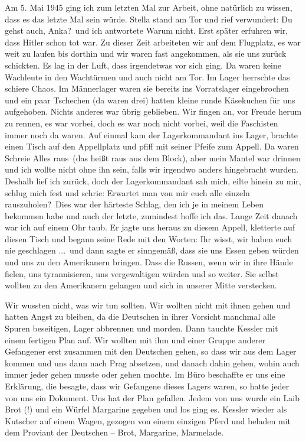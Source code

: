 \documentclass[a4paper,12pt,ngerman,
]{nisebook}
\begin{document}
Am 5. Mai 1945 ging ich zum letzten Mal zur Arbeit, ohne natürlich zu wissen, dass es das letzte Mal sein würde. Stella stand am Tor und rief verwundert: \glqq Du gehst auch, Anka?\grqq~und ich antwortete \glqq Warum nicht\grqq. Erst später erfuhren wir, dass Hitler schon tot war. Zu dieser Zeit arbeiteten wir auf dem Flugplatz, es war weit zu laufen bis dorthin und wir waren fast angekommen, als sie uns zurück schickten. Es lag in der Luft, dass irgendetwas vor sich ging. Da waren keine Wachleute in den Wachtürmen und auch nicht am Tor. Im Lager herrschte das schiere Chaos. Im Männerlager waren sie bereits ins Vorratslager eingebrochen und ein paar Tschechen (da waren drei) hatten kleine runde Käsekuchen für uns aufgehoben. Nichts anderes war übrig geblieben. Wir fingen an, vor Freude herum zu rennen, es war vorbei, doch es war noch nicht vorbei, weil die Faschisten immer noch da waren. Auf einmal kam der Lagerkommandant ins Lager, brachte einen Tisch auf den Appellplatz und pfiff mit seiner Pfeife zum Appell. Da waren Schreie \glqq Alles raus\grqq~(das heißt raus aus dem Block), aber mein Mantel war drinnen und ich wollte nicht ohne ihn sein, falls wir irgendwo anders hingebracht wurden. Deshalb lief ich zurück, doch der Lagerkommandant sah mich, eilte hinein zu mir, schlug mich fest und schrie: \glqq Erwartet man von mir euch alle einzeln rauszuholen?\grqq~Dies war der härteste Schlag, den ich je in meinem Leben bekommen habe und auch der letzte, zumindest hoffe ich das. Lange Zeit danach war ich auf einem Ohr taub. Er jagte uns heraus zu diesem Appell, kletterte auf diesen Tisch und begann seine Rede mit den Worten: \glqq Ihr wisst, wir haben euch nie geschlagen ...\grqq~und dann sagte er sinngemäß, dass sie uns Essen geben würden und uns zu den Amerikanern bringen. Dass die Russen, wenn wir in ihre Hände fielen, uns tyrannisieren, uns vergewaltigen würden und so weiter. Sie selbst wollten zu den Amerikanern gelangen und sich in unserer Mitte verstecken. 

Wir wussten nicht, was wir tun sollten. Wir wollten nicht mit ihnen gehen und hatten Angst zu bleiben, da die Deutschen in ihrer Vorsicht manchmal alle Spuren beseitigen, Lager abbrennen und morden. Dann tauchte Kessler mit einem fertigen Plan auf. Wir wollten mit ihm und einer Gruppe anderer Gefangener erst zusammen mit den Deutschen gehen, so dass wir aus dem Lager kommen und uns dann nach Prag absetzen, und danach dahin gehen, wohin auch immer jeder gehen musste oder gehen mochte. Im Büro beschaffte er uns eine Erklärung, die besagte, dass wir Gefangene dieses Lagers waren, so hatte jeder von uns ein Dokument. Uns hat der Plan gefallen. Jedem von uns wurde ein Laib Brot (!) und ein Würfel Margarine gegeben und los ging es. Kessler wieder als Kutscher auf einem Wagen, gezogen von einem einzigen Pferd und beladen mit dem Proviant der Deutschen -- Brot, Margarine, Marmelade.
\end{document}
